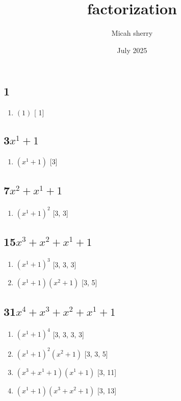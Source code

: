 \documentclass[10pt,twocolumn]{article}
\title{factorization }
\author{Micah sherry}
\date{July 2025}
\begin{document}
\subsection*{1}
\begin{enumerate}
\item $(1)$  [ 1]
\end{enumerate}

\subsection*{3$x^{1} + 1$  } 
\begin{enumerate}
\item $(x^{1} + 1)$  [3]
\end{enumerate}

\subsection*{7$x^{2} + x^{1} + 1$  } 
\begin{enumerate}
\item $(x^{1} + 1)^{2}$  [3, 3]
\end{enumerate}

\subsection*{15$x^{3} + x^{2} + x^{1} + 1$  } 
\begin{enumerate}
\item $(x^{1} + 1)^{3}$  [3, 3, 3]
\item $(x^{1} + 1)(x^{2} + 1)$  [3, 5]
\end{enumerate}

\subsection*{31$x^{4} + x^{3} + x^{2} + x^{1} + 1$  } 
\begin{enumerate}
\item $(x^{1} + 1)^{4}$  [3, 3, 3, 3]
\item $(x^{1} + 1)^{2}(x^{2} + 1)$  [3, 3, 5]
\item $(x^{3} + x^{1} + 1)(x^{1} + 1)$  [3, 11]
\item $(x^{1} + 1)(x^{3} + x^{2} + 1)$  [3, 13]
\end{enumerate}
\end{document}
